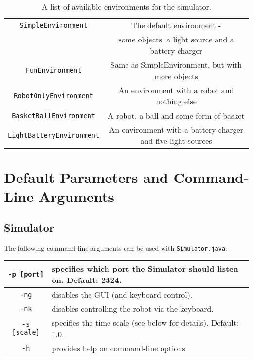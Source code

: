 \documentclass[12pt]{article}
\newcommand{\code}[1]{\texttt{#1}}
\begin{document}
\begin{table}
\small{
\begin{tabular}{|c|c|}
\hline
\code{SimpleEnvironment} & The default environment - \\
& some objects, a light source and a battery charger \\
\hline
\code{FunEnvironment} & Same as SimpleEnvironment, but with more objects \\
\hline
\code{RobotOnlyEnvironment} & An environment with a robot and nothing else \\
\hline
\code{BasketBallEnvironment} & A robot, a ball and some form of basket \\
\hline
\code{LightBatteryEnvironment} & An environment with a battery charger and five light sources \\ 
\hline
\end{tabular}
}
\caption{A list of available environments for the simulator.\label{table:environment_list}}
\end{table}

\section{Default Parameters and Command-Line Arguments\label{sec:changingDefaults}}

\subsection{Simulator}\label{subsec:simulator_parameters}

The following command-line arguments can be used with \verb+Simulator.java+:

\begin{center}
\begin{tabular}{|c|l|}
\hline
\verb+-p [port]+ & specifies which port the Simulator should listen on. Default: 2324. \\
\hline
\verb+-ng+ & disables the GUI (and keyboard control). \\
\hline
\verb+-nk+ & disables controlling the robot via the keyboard. \\
\hline
\verb+-s [scale]+ & specifies the time scale (see below for details). Default: 1.0. \\
\hline
\verb+-h+ & provides help on command-line options \\ 
\hline
\end{tabular}
\end{center}
\end{document}
